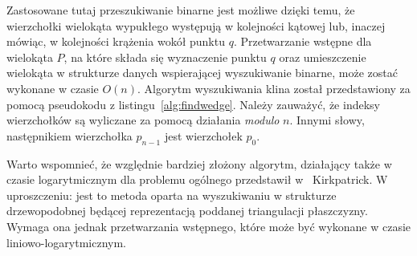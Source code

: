 




Zastosowane tutaj przeszukiwanie binarne jest możliwe dzięki temu, że
wierzchołki wielokąta wypukłego występują w kolejności kątowej lub,
inaczej mówiąc, w kolejności krążenia wokół punktu $q$. Przetwarzanie
wstępne dla wielokąta $P$, na które składa się wyznaczenie punktu $q$
oraz umieszczenie wielokąta w strukturze danych wspierającej
wyszukiwanie binarne, może zostać wykonane w czasie $O(n)$. Algorytm
wyszukiwania klina został przedstawiony za pomocą pseudokodu z
listingu~\ref{alg:findwedge}. Należy zauważyć, że indeksy wierzchołków
są wyliczane za pomocą działania \emph{modulo} $n$. Innymi słowy,
następnikiem wierzchołka $p_{n-1}$ jest wierzchołek $p_0$.

Warto wspomnieć, że względnie bardziej złożony algorytm, działający
także w czasie logarytmicznym dla problemu ogólnego przedstawił
w~\cite{Kirk83} Kirkpatrick. W uproszczeniu: jest to metoda oparta na
wyszukiwaniu w strukturze drzewopodobnej będącej reprezentacją
poddanej triangulacji płaszczyzny. Wymaga ona jednak przetwarzania
wstępnego, które może być wykonane w czasie liniowo-logarytmicznym.


